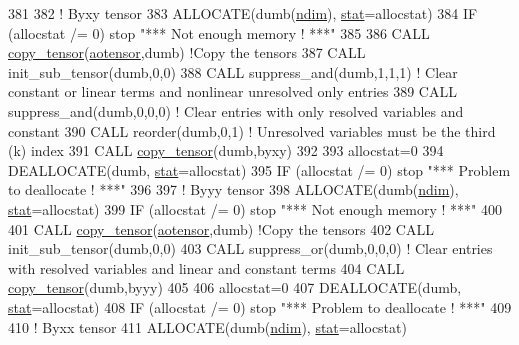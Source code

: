 \begin{DoxyCode}
381 
382     \textcolor{comment}{! Byxy tensor}
383     \textcolor{keyword}{ALLOCATE}(dumb(\hyperlink{namespaceparams_a2323fe1773f086e20c14f266351c482b}{ndim}), \hyperlink{namespacestat}{stat}=allocstat)
384     \textcolor{keywordflow}{IF} (allocstat /= 0) stop \textcolor{stringliteral}{"*** Not enough memory ! ***"}
385 
386     \textcolor{keyword}{CALL }\hyperlink{namespacetensor_a4a88ee8077278486c5128ad97617969e}{copy\_tensor}(\hyperlink{namespaceaotensor__def_a0dc43bc9294a18f2fe57b67489f1702f}{aotensor},dumb) \textcolor{comment}{!Copy the tensors}
387     \textcolor{keyword}{CALL }init\_sub\_tensor(dumb,0,0)
388     \textcolor{keyword}{CALL }suppress\_and(dumb,1,1,1) \textcolor{comment}{! Clear constant or linear terms and nonlinear unresolved only entries}
389     \textcolor{keyword}{CALL }suppress\_and(dumb,0,0,0) \textcolor{comment}{! Clear entries with only resolved variables and constant}
390     \textcolor{keyword}{CALL }reorder(dumb,0,1) \textcolor{comment}{! Unresolved variables must be the third (k) index}
391     \textcolor{keyword}{CALL }\hyperlink{namespacetensor_a4a88ee8077278486c5128ad97617969e}{copy\_tensor}(dumb,byxy)
392 
393     allocstat=0
394     \textcolor{keyword}{DEALLOCATE}(dumb, \hyperlink{namespacestat}{stat}=allocstat)
395     \textcolor{keywordflow}{IF} (allocstat /= 0)  stop \textcolor{stringliteral}{"*** Problem to deallocate ! ***"}
396 
397     \textcolor{comment}{! Byyy tensor}
398     \textcolor{keyword}{ALLOCATE}(dumb(\hyperlink{namespaceparams_a2323fe1773f086e20c14f266351c482b}{ndim}), \hyperlink{namespacestat}{stat}=allocstat)
399     \textcolor{keywordflow}{IF} (allocstat /= 0) stop \textcolor{stringliteral}{"*** Not enough memory ! ***"}
400 
401     \textcolor{keyword}{CALL }\hyperlink{namespacetensor_a4a88ee8077278486c5128ad97617969e}{copy\_tensor}(\hyperlink{namespaceaotensor__def_a0dc43bc9294a18f2fe57b67489f1702f}{aotensor},dumb) \textcolor{comment}{!Copy the tensors}
402     \textcolor{keyword}{CALL }init\_sub\_tensor(dumb,0,0)
403     \textcolor{keyword}{CALL }suppress\_or(dumb,0,0,0) \textcolor{comment}{! Clear entries with resolved variables and linear and constant terms}
404     \textcolor{keyword}{CALL }\hyperlink{namespacetensor_a4a88ee8077278486c5128ad97617969e}{copy\_tensor}(dumb,byyy)
405 
406     allocstat=0
407     \textcolor{keyword}{DEALLOCATE}(dumb, \hyperlink{namespacestat}{stat}=allocstat)
408     \textcolor{keywordflow}{IF} (allocstat /= 0)  stop \textcolor{stringliteral}{"*** Problem to deallocate ! ***"}
409 
410     \textcolor{comment}{! Byxx tensor}
411     \textcolor{keyword}{ALLOCATE}(dumb(\hyperlink{namespaceparams_a2323fe1773f086e20c14f266351c482b}{ndim}), \hyperlink{namespacestat}{stat}=allocstat)

\end{DoxyCode}

